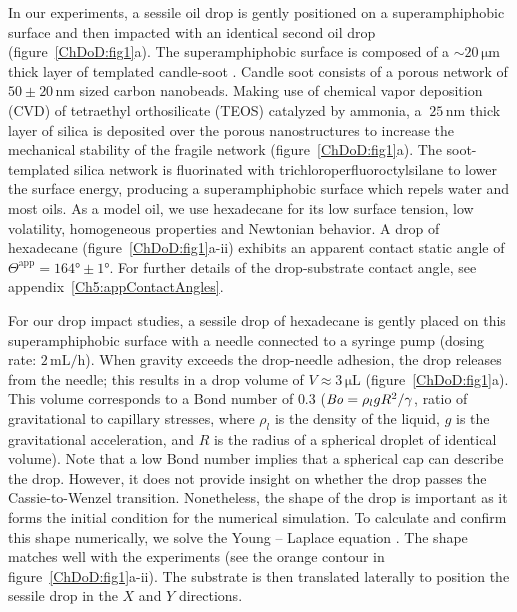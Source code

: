 In our experiments, a sessile oil drop is gently positioned on a superamphiphobic surface and then impacted with an identical second oil drop (figure~\ref{ChDoD:fig1}a). The superamphiphobic surface is composed of a $\sim 20\,\si{\micro\meter}$ thick layer of templated candle-soot \cite{pham2017spontaneous, deng2012}. Candle soot consists of a porous network of $50 \pm 20\,\si{\nano\meter}$ sized carbon nanobeads. Making use of chemical vapor deposition (CVD) of tetraethyl orthosilicate (TEOS) catalyzed by ammonia, a $~ 25\,\si{\nano\meter}$ thick layer of silica is deposited over the porous nanostructures to increase the mechanical stability of the fragile network  (figure~\ref{ChDoD:fig1}a). The soot-templated silica network is fluorinated with trichloroperfluoroctylsilane to lower the surface energy, producing a superamphiphobic surface which repels water and most oils. As a model oil, we use hexadecane for its low surface tension, low volatility, homogeneous properties and Newtonian behavior. A drop of hexadecane (figure~\ref{ChDoD:fig1}a-ii) exhibits an apparent contact static angle of $\Theta^{\text{app}} = 164\si{\degree} \pm 1\si{\degree}$. For further details of the drop-substrate contact angle, see appendix~\ref{Ch5:appContactAngles}.

For our drop impact studies, a sessile drop of hexadecane is gently placed on this superamphiphobic surface with a needle connected to a syringe pump (dosing rate: $2\,\si{\milli\liter}/\si{\hour}$). When gravity exceeds the drop-needle adhesion, the drop releases from the needle; this results in a drop volume of $V \approx 3\,\si{\micro\liter}$ (figure~\ref{ChDoD:fig1}a). This volume corresponds to a Bond number of $0.3$ ($\mathit{Bo} = \rho_lgR^2/\gamma$, ratio of gravitational to capillary stresses, where $\rho_l$ is the density of the liquid, $g$ is the gravitational acceleration, and $R$ is the radius of a spherical droplet of identical volume). Note that a low Bond number implies that a spherical cap can describe the drop. However, it does not provide insight on whether the drop passes the Cassie-to-Wenzel transition. Nonetheless, the shape of the drop is important as it forms the initial condition for the numerical simulation. To calculate and confirm this shape numerically, we solve the Young – Laplace equation \cite{book-degennes}. The shape matches well with the experiments (see the orange contour in figure~\ref{ChDoD:fig1}a-ii). The substrate is then translated laterally to position the sessile drop in the $X$ and $Y$ directions.

